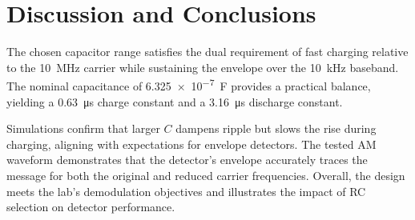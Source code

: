 \documentclass[12pt]{article}
\begin{document}
\clearpage
\section*{Discussion and Conclusions}
The chosen capacitor range satisfies the dual requirement of fast charging relative to the \SI{10}{\mega\hertz} carrier while sustaining the envelope over the \SI{10}{\kilo\hertz} baseband. The nominal capacitance of \SI{6.325e-7}{\farad} provides a practical balance, yielding a \SI{0.63}{\micro\second} charge constant and a \SI{3.16}{\micro\second} discharge constant.

Simulations confirm that larger $C$ dampens ripple but slows the rise during charging, aligning with expectations for envelope detectors. The tested AM waveform demonstrates that the detector's envelope accurately traces the message for both the original and reduced carrier frequencies. Overall, the design meets the lab's demodulation objectives and illustrates the impact of RC selection on detector performance.

\clearpage
\end{document}
